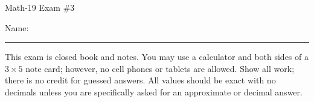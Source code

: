 \documentclass[letterpaper,12pt,fleqn]{article}
\begin{document}
\begin{center}
\Large Math-19 Exam \#3
\end{center}

\vspace{0.5in}

Name: \rule{4in}{1pt}

\vspace{0.5in}

This exam is closed book and notes. You may use a calculator and both sides of
a $3\times 5$ note card; however, no cell phones or tablets are allowed. Show
all work; there is no credit for guessed answers. All values should be exact
with no decimals unless you are specifically asked for an approximate or
decimal answer.

\vspace{0.5in}
\end{document}

